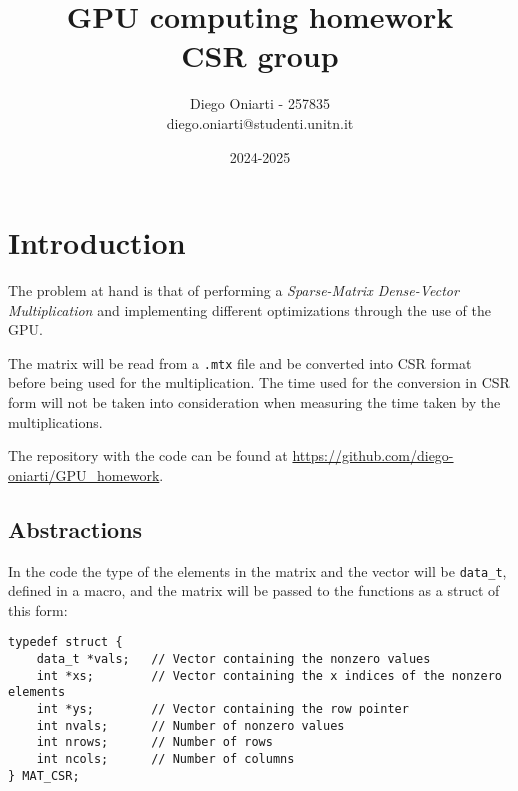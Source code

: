 \documentclass{article}
\title{
    GPU computing homework\\
\large CSR group}
\author{Diego Oniarti - 257835 \\ diego.oniarti@studenti.unitn.it}
\date{2024-2025}
\begin{document}
\maketitle

\section{Introduction}
The problem at hand is that of performing a \textit{Sparse-Matrix Dense-Vector Multiplication} and implementing different optimizations through the use of the GPU.

The matrix will be read from a \texttt{.mtx} file and be converted into CSR format before being used for the multiplication. The time used for the conversion in CSR form will not be taken into consideration when measuring the time taken by the multiplications.

The repository with the code can be found at \url{https://github.com/diego-oniarti/GPU_homework}.

\subsection{Abstractions}
In the code the type of the elements in the matrix and the vector will be \texttt{data\_t}, defined in a macro, and the matrix will be passed to the functions as a struct of this form:
\begin{verbatim}
typedef struct {
    data_t *vals;   // Vector containing the nonzero values
    int *xs;        // Vector containing the x indices of the nonzero elements
    int *ys;        // Vector containing the row pointer
    int nvals;      // Number of nonzero values
    int nrows;      // Number of rows
    int ncols;      // Number of columns
} MAT_CSR;
\end{verbatim}
\end{document}
